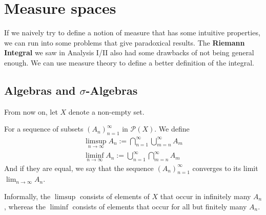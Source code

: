 \section{Measure spaces}

If we naively try to define a notion of measure that has some intuitive properties, we can run into some problems that give paradoxical results.
The \textbf{Riemann Integral} we saw in Analysis I/II also had some drawbacks of not being general enough. 
We can use measure theory to define a better definition of the integral.

\subsection{Algebras and $\sigma$-Algebras}
From now on, let $X$ denote a non-empty set.

\begin{dfn}[]\label{dfn:lim-set}
  For a sequence of subsets $\left(A_{n}\right)_{n = 1}^{\infty}$ in $\mathcal{P}(X)$. We define
\begin{align*}
  \limsup_{n \to \infty}A_n := \bigcap_{n=1}^{\infty} \bigcup_{m=n}^{\infty}A_m\\
  \liminf_{n \to \infty}A_n := \bigcup_{n=1}^{\infty} \bigcap_{m=n}^{\infty}A_m
\end{align*}
And if they are equal, we say that the sequence $\left(A_{n}\right)_{n = 1}^{\infty}$ converges to its limit $\lim_{n \to \infty} A_n$.
\end{dfn}

Informally, the $\limsup$ consists of elements of $X$ that occur in infinitely many $A_n$, whereas the $\liminf$ consists of elements that occur for all but finitely many $A_n$.


